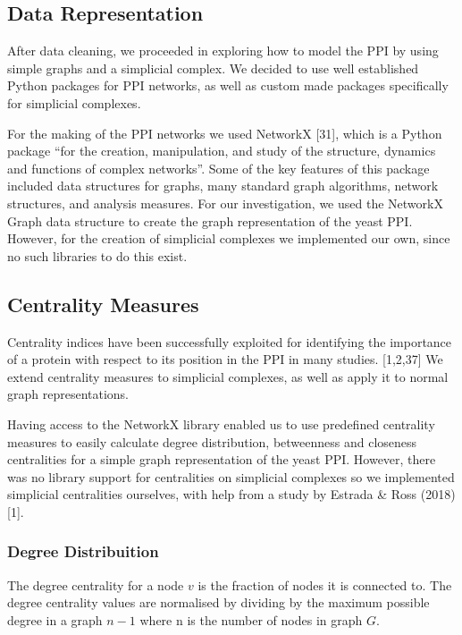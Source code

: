 \documentclass[9pt]{article}
\begin{document}
\subsection{Data Representation}
After data cleaning, we proceeded in exploring how to model the PPI by using simple graphs and a simplicial complex. We decided to use well established Python packages for PPI networks, as well as custom made packages specifically for simplicial complexes.
\par
For the making of the PPI networks we used NetworkX [31], which is a Python package “for the creation, manipulation, and study of the structure, dynamics and functions of complex networks”. Some of the key features of this package included data structures for graphs, many standard graph algorithms, network structures, and analysis measures. For our investigation, we used the NetworkX Graph data structure to create the graph representation of the yeast PPI.  However, for the creation of simplicial complexes we implemented our own, since no such libraries to do this exist. 

\subsection{Centrality Measures}
Centrality indices have been successfully exploited for identifying the importance of a protein with respect to its position in the PPI in many studies. [1,2,37] We extend centrality measures to simplicial complexes, as well as apply it to normal graph representations.

Having access to the NetworkX library enabled us to use predefined centrality measures to easily calculate degree distribution, betweenness and closeness centralities for a simple graph representation of the yeast PPI. However, there was no library support for centralities on simplicial complexes so we implemented simplicial centralities ourselves, with help from a study by Estrada \& Ross (2018) [1].

\subsubsection{Degree Distribuition}
The degree centrality for a node \(v\) is the fraction of nodes it is connected to. The degree centrality values are normalised by dividing by the maximum possible degree in a graph \(n-1\) where n is the number of nodes in graph \(G\).
\end{document}
